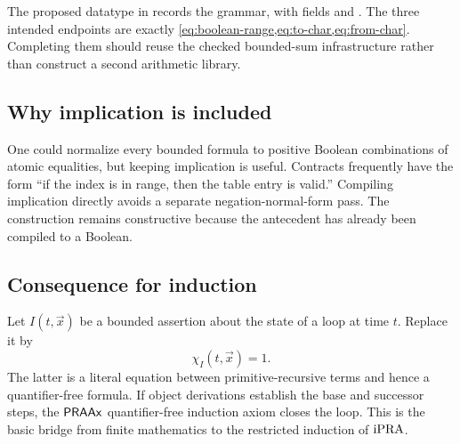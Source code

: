 The proposed  datatype in
 records the grammar, with fields
 and .  The three intended endpoints are exactly
\cref{eq:boolean-range,eq:to-char,eq:from-char}.  Completing them should reuse the
checked bounded-sum infrastructure rather than construct a second arithmetic library.

\subsection{Why implication is included}

One could normalize every bounded formula to positive Boolean combinations of atomic
equalities, but keeping implication is useful.  Contracts frequently have the form
``if the index is in range, then the table entry is valid.''  Compiling implication
directly avoids a separate negation-normal-form pass.  The construction remains
constructive because the antecedent has already been compiled to a Boolean.

\subsection{Consequence for induction}

Let \(I(t,\vec x)\) be a bounded assertion about the state of a loop at time \(t\).
Replace it by
\[
   \chi_I(t,\vec x)=1.
\]
The latter is a literal equation between primitive-recursive terms and hence a
quantifier-free formula.  If object derivations establish the base and successor
steps, the \(\mathsf{PRAAx}\) quantifier-free induction axiom closes the loop.  This is the
basic bridge from finite mathematics to the restricted induction of \(\mathrm{iPRA}\).
